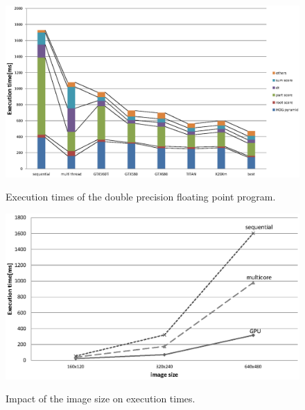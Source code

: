 \begin{figure}[t]
 \begin{center}
  \includegraphics[width=\hsize]{fig/double_exe_time.eps}\\
  \caption{Execution times of the double precision floating point program.}
  \label{fig:double_exe_time}
 \end{center}
\end{figure}

\begin{figure}[t]
 \begin{center}
  \includegraphics[width=\hsize]{fig/time_on_image_size.eps}\\
  \caption{Impact of the image size on execution times.}
  \label{fig:time_on_image_sizedouble_exe_time}
 \end{center}
\end{figure}



